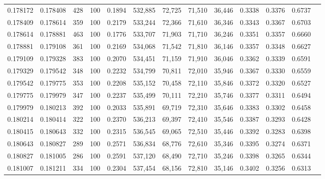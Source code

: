 \begin{tabular}{rrrrrrrrrrrrr}
0.178172 & 0.178408 &   428 & 100 &                                     0.1894 & 532,885 &  72,725 &  71,510 &  36,446 & 0.3338 & 0.3376 & 0.6737 \\
0.178409 & 0.178614 &   359 & 100 &                                     0.2179 & 533,244 &  72,366 &  71,610 &  36,346 & 0.3343 & 0.3367 & 0.6703 \\
0.178614 & 0.178881 &   463 & 100 &                                     0.1776 & 533,707 &  71,903 &  71,710 &  36,246 & 0.3351 & 0.3357 & 0.6660 \\
0.178881 & 0.179108 &   361 & 100 &                                     0.2169 & 534,068 &  71,542 &  71,810 &  36,146 & 0.3357 & 0.3348 & 0.6627 \\
0.179109 & 0.179328 &   383 & 100 &                                     0.2070 & 534,451 &  71,159 &  71,910 &  36,046 & 0.3362 & 0.3339 & 0.6591 \\
0.179329 & 0.179542 &   348 & 100 &                                     0.2232 & 534,799 &  70,811 &  72,010 &  35,946 & 0.3367 & 0.3330 & 0.6559 \\
0.179542 & 0.179775 &   353 & 100 &                                     0.2208 & 535,152 &  70,458 &  72,110 &  35,846 & 0.3372 & 0.3320 & 0.6527 \\
0.179775 & 0.179979 &   347 & 100 &                                     0.2237 & 535,499 &  70,111 &  72,210 &  35,746 & 0.3377 & 0.3311 & 0.6494 \\
0.179979 & 0.180213 &   392 & 100 &                                     0.2033 & 535,891 &  69,719 &  72,310 &  35,646 & 0.3383 & 0.3302 & 0.6458 \\
0.180214 & 0.180414 &   322 & 100 &                                     0.2370 & 536,213 &  69,397 &  72,410 &  35,546 & 0.3387 & 0.3293 & 0.6428 \\
0.180415 & 0.180643 &   332 & 100 &                                     0.2315 & 536,545 &  69,065 &  72,510 &  35,446 & 0.3392 & 0.3283 & 0.6398 \\
0.180643 & 0.180827 &   289 & 100 &                                     0.2571 & 536,834 &  68,776 &  72,610 &  35,346 & 0.3395 & 0.3274 & 0.6371 \\
0.180827 & 0.181005 &   286 & 100 &                                     0.2591 & 537,120 &  68,490 &  72,710 &  35,246 & 0.3398 & 0.3265 & 0.6344 \\
0.181007 & 0.181211 &   334 & 100 &                                     0.2304 & 537,454 &  68,156 &  72,810 &  35,146 & 0.3402 & 0.3256 & 0.6313 \\

\end{tabular}
